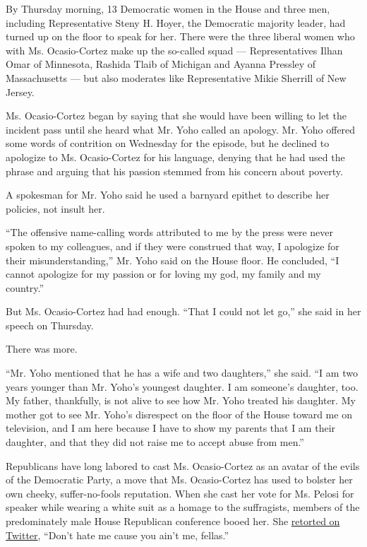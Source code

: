 By Thursday morning, 13 Democratic women in the House and three men,
including Representative Steny H. Hoyer, the Democratic majority leader,
had turned up on the floor to speak for her. There were the three
liberal women who with Ms. Ocasio-Cortez make up the so-called squad ---
Representatives Ilhan Omar of Minnesota, Rashida Tlaib of Michigan and
Ayanna Pressley of Massachusetts --- but also moderates like
Representative Mikie Sherrill of New Jersey.

Ms. Ocasio-Cortez began by saying that she would have been willing to
let the incident pass until she heard what Mr. Yoho called an apology.
Mr. Yoho offered some words of contrition on Wednesday for the episode,
but he declined to apologize to Ms. Ocasio-Cortez for his language,
denying that he had used the phrase and arguing that his passion stemmed
from his concern about poverty.

A spokesman for Mr. Yoho said he used a barnyard epithet to describe her
policies, not insult her.

``The offensive name-calling words attributed to me by the press were
never spoken to my colleagues, and if they were construed that way, I
apologize for their misunderstanding,'' Mr. Yoho said on the House
floor. He concluded, ``I cannot apologize for my passion or for loving
my god, my family and my country.''

But Ms. Ocasio-Cortez had had enough. ``That I could not let go,'' she
said in her speech on Thursday.

There was more.

``Mr. Yoho mentioned that he has a wife and two daughters,'' she said.
``I am two years younger than Mr. Yoho's youngest daughter. I am
someone's daughter, too. My father, thankfully, is not alive to see how
Mr. Yoho treated his daughter. My mother got to see Mr. Yoho's
disrespect on the floor of the House toward me on television, and I am
here because I have to show my parents that I am their daughter, and
that they did not raise me to accept abuse from men.''

Republicans have long labored to cast Ms. Ocasio-Cortez as an avatar of
the evils of the Democratic Party, a move that Ms. Ocasio-Cortez has
used to bolster her own cheeky, suffer-no-fools reputation. When she
cast her vote for Ms. Pelosi for speaker while wearing a white suit as a
homage to the suffragists, members of the predominately male House
Republican conference booed her. She
\href{https://twitter.com/AOC/status/1080998665672630272}{retorted on
Twitter}, ``Don't hate me cause you ain't me, fellas.''

